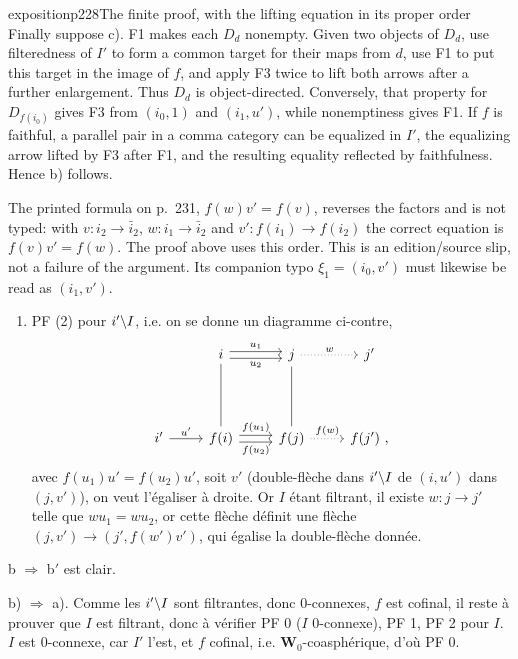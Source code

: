 \begin{dcomment}{exposition}{p228}{The finite proof, with the lifting equation in its proper order}
Finally suppose c).  F1 makes each $D_d$ nonempty.  Given two objects of $D_d$, use filteredness of $I'$ to form a common target for their maps from $d$, use F1 to put this target in the image of $f$, and apply F3 twice to lift both arrows after a further enlargement.  Thus $D_d$ is object-directed.  Conversely, that property for $D_{f(i_0)}$ gives F3 from $(i_0,1)$ and $(i_1,u')$, while nonemptiness gives F1.  If $f$ is faithful, a parallel pair in a comma category can be equalized in $I'$, the equalizing arrow lifted by F3 after F1, and the resulting equality reflected by faithfulness.  Hence b) follows.

The printed formula on p.~231, $f(w)v'=f(v)$, reverses the factors and is not typed: with $v:i_2\to\bar i_2$, $w:i_1\to\bar i_2$ and $v':f(i_1)\to f(i_2)$ the correct equation is $f(v)v'=f(w)$.  The proof above uses this order.  This is an edition/source slip, not a failure of the argument.  Its companion typo $\xi_1=(i_0,v')$ must likewise be read as $(i_1,v')$.
\end{dcomment}


\begin{enumerate}[label=\arabic*), start=2]
\item PF (2) pour $i'\backslash I$, i.e. on se donne un diagramme ci-contre,
\[
\begin{tikzcd}
{} & i \arrow[r, shift left, "u_1"] \arrow[r, shift right, "u_2"'] \arrow[dd, dash] & j \arrow[r, dotted, "w"] \arrow[dd, dash] & j' \\
{} & {} & {} & {} \\
i' \arrow[r, "u'"] & f(i) \arrow[r, shift left, "f(u_1)"] \arrow[r, shift right, "f(u_2)"'] & f(j) \arrow[r, dotted, "f(w)"] & f(j') \ ,
\end{tikzcd}
\]
avec $f(u_1)u' = f(u_2)u'$, soit $v'$ (double-flèche dans $i'\backslash I$ de $(i,u')$ dans $(j,v')$), on veut l'égaliser à droite. Or $I$ étant filtrant, il existe $w : j \longrightarrow j'$ telle que $wu_1 = wu_2$, or cette flèche définit une flèche $(j,v') \longrightarrow (j', f(w')v')$, qui égalise la double-flèche donnée. %
\end{enumerate}

b $\Longrightarrow$ b$'$ est clair.

b) $\Longrightarrow$ a). Comme les $i'\backslash I$ sont filtrantes, donc 0-connexes, $f$ est cofinal, il reste à prouver que $I$ est filtrant, donc à vérifier PF 0 ($I$ 0-connexe), PF 1, PF 2 pour $I$. $I$ est 0-connexe, car $I'$ l'est, et $f$ cofinal, i.e. $\mathbf{W}_0$-coasphérique, d'où PF 0.

